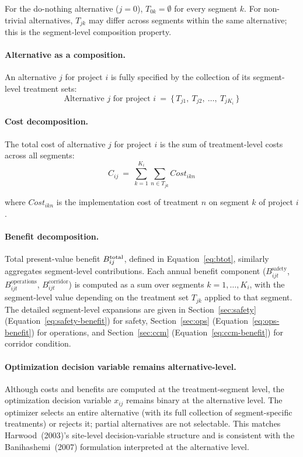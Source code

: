 \noindent For the do-nothing alternative ($j = 0$), $T_{0k} = \emptyset$ for
every segment $k$. For non-trivial alternatives, $T_{jk}$ may differ across
segments within the same alternative; this is the segment-level composition
property.

\paragraph{Alternative as a composition.} An alternative $j$ for project $i$
is fully specified by the collection of its segment-level treatment sets:
\begin{equation*}
\text{Alternative } j \text{ for project } i\ =\ \{\, T_{j1},\ T_{j2},\ \ldots,\ T_{jK_i} \,\}
\end{equation*}

\paragraph{Cost decomposition.} The total cost of alternative $j$ for
project $i$ is the sum of treatment-level costs across all segments:
\begin{equation}
C_{ij}\ =\ \sum_{k=1}^{K_i} \sum_{n \in T_{jk}} \mathit{Cost}_{ikn}
\label{eq:cost-decomp}
\end{equation}

\noindent where $\mathit{Cost}_{ikn}$ is the implementation cost of
treatment $n$ on segment $k$ of project $i$.

\paragraph{Benefit decomposition.} Total present-value benefit
$B^{\mathrm{total}}_{ij}$, defined in Equation~\ref{eq:btot}, similarly aggregates
segment-level contributions. Each annual benefit component
($B_{ijt}^{\mathrm{safety}}$, $B_{ijt}^{\mathrm{operations}}$,
$B_{ijt}^{\mathrm{corridor}}$) is computed as a sum over segments
$k = 1, \ldots, K_i$, with the segment-level value depending on the
treatment set $T_{jk}$ applied to that segment. The detailed
segment-level expansions are given in Section~\ref{sec:safety}
(Equation~\ref{eq:safety-benefit}) for safety, Section~\ref{sec:ops}
(Equation~\ref{eq:ops-benefit}) for operations, and Section~\ref{sec:ccm}
(Equation~\ref{eq:ccm-benefit}) for corridor condition.

\paragraph{Optimization decision variable remains alternative-level.}
Although costs and benefits are computed at the treatment-segment level,
the optimization decision variable $x_{ij}$ remains binary at the
alternative level. The optimizer selects an entire alternative (with its
full collection of segment-specific treatments) or rejects it; partial
alternatives are not selectable. This matches Harwood~(2003)'s site-level
decision-variable structure and is consistent with the Banihashemi~(2007)
formulation interpreted at the alternative level.

